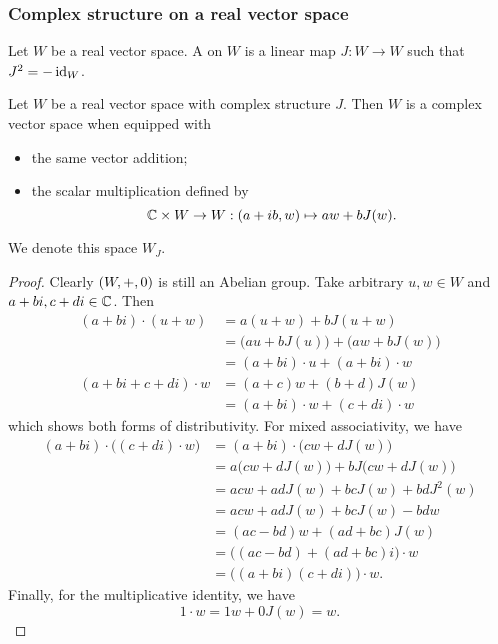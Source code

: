 \subsubsection{Complex structure on a real vector space}
\begin{definition}
Let $W$ be a real vector space. A  on $W$ is a linear map $J: W\to W$ such that $J^2 = -\operatorname{id}_W$.
\end{definition}

\begin{lemma}
Let $W$ be a real vector space with complex structure $J$. Then $W$ is a complex vector space when equipped with
\begin{itemize}
\item the same vector addition;
\item the scalar multiplication defined by
\[ \mathbb{C} \times W \to W: (a+ib, w) \mapsto aw + bJ(w). \]
\end{itemize}
We denote this space $W_J$.
\end{lemma}
\begin{proof}
Clearly $\sSet{W,+,0}$ is still an Abelian group. Take arbitrary $u,w\in W$ and $a+bi, c+di \in \mathbb{C}$. Then
\begin{align*}
(a+bi)\cdot (u+w) &= a(u+w) + bJ(u+w) \\
&= \big(au + bJ(u)\big) + \big(aw + bJ(w)\big) \\
&= (a+bi)\cdot u + (a+bi)\cdot w \\
(a+bi + c + di)\cdot w &= (a+c)w + (b+d)J(w) \\
&= (a+bi)\cdot w + (c+di)\cdot w
\end{align*}
which shows both forms of distributivity. For mixed associativity, we have
\begin{align*}
(a+bi)\cdot\big((c + di)\cdot w\big) &= (a+bi)\cdot\big(cw+dJ(w)\big) \\
&= a\big(cw+dJ(w)\big) + bJ\big(cw+dJ(w)\big) \\
&= acw+adJ(w) + bcJ(w) + bdJ^2(w) \\
&= acw+adJ(w) + bcJ(w) - bdw \\
&= (ac- bd)w+(ad+ bc)J(w) \\
&= \big((ac- bd)+(ad+ bc)i\big)\cdot w \\
&= \big((a+bi)(c+di)\big)\cdot w.
\end{align*}
Finally, for the multiplicative identity, we have
\[ 1\cdot w = 1w + 0J(w) = w. \]
\end{proof}


